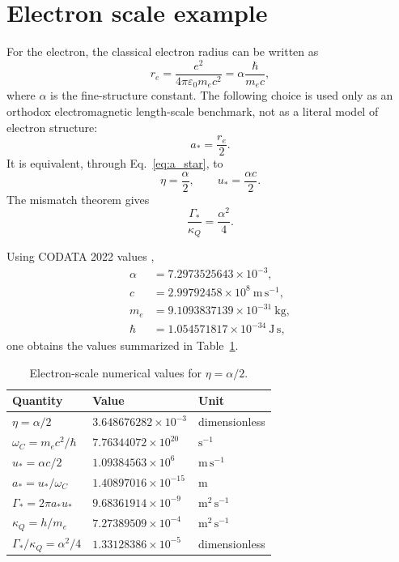 \documentclass[11pt,a4paper]{article}
\newcommand{\kappaQ}{\kappa_{Q}}
\newcommand{\GammaStar}{\Gamma_{*}}
\newcommand{\uStar}{u_{*}}
\newcommand{\aStar}{a_{*}}
\newcommand{\re}{r_{e}}
\begin{document}
\section{Electron scale example}

For the electron, the classical electron radius can be written as
\begin{equation}
    \re=\frac{e^2}{4\pi\varepsilon_0m_ec^2}
    =
    \alpha\frac{\hbar}{m_ec},
    \label{eq:classical_electron_radius}
\end{equation}
where $\alpha$ is the fine-structure constant. The following choice is used only as an orthodox electromagnetic length-scale benchmark, not as a literal model of electron structure:
\begin{equation}
    \aStar=\frac{\re}{2}.
\end{equation}
It is equivalent, through Eq.~\eqref{eq:a_star}, to
\begin{equation}
    \eta=\frac{\alpha}{2},
    \qquad
    \uStar=\frac{\alpha c}{2}.
\end{equation}
The mismatch theorem gives
\begin{equation}
    \frac{\GammaStar}{\kappaQ}
    =
    \frac{\alpha^2}{4}.
    \label{eq:alpha_mismatch}
\end{equation}

Using CODATA 2022 values \cite{CODATA2022},
\begin{align}
    \alpha &= 7.2973525643\times10^{-3},\\
    c &= 2.99792458\times10^8\ \mathrm{m\,s^{-1}},\\
    m_e &= 9.1093837139\times10^{-31}\ \mathrm{kg},\\
    \hbar &= 1.054571817\times10^{-34}\ \mathrm{J\,s},
\end{align}
one obtains the values summarized in Table~\ref{tab:numerics}.

\begin{table}[h]
\centering
\caption{Electron-scale numerical values for $\eta=\alpha/2$.}
\label{tab:numerics}
\begin{tabular}{lll}
\toprule
Quantity & Value & Unit \\
\midrule
$\eta=\alpha/2$ & $3.648676282\times10^{-3}$ & dimensionless \\
$\omega_C=m_ec^2/\hbar$ & $7.76344072\times10^{20}$ & $\mathrm{s^{-1}}$ \\
$u_* = \alpha c/2$ & $1.09384563\times10^{6}$ & $\mathrm{m\,s^{-1}}$ \\
$a_* = u_*/\omega_C$ & $1.40897016\times10^{-15}$ & $\mathrm{m}$ \\
$\Gamma_*=2\pi a_*u_*$ & $9.68361914\times10^{-9}$ & $\mathrm{m^2\,s^{-1}}$ \\
$\kappa_Q=h/m_e$ & $7.27389509\times10^{-4}$ & $\mathrm{m^2\,s^{-1}}$ \\
$\Gamma_*/\kappa_Q=\alpha^2/4$ & $1.33128386\times10^{-5}$ & dimensionless \\
\bottomrule
\end{tabular}
\end{table}
\end{document}
